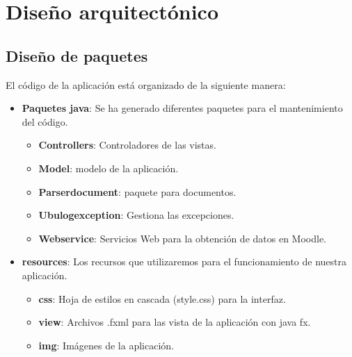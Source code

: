 \section{Diseño arquitectónico}

\subsection{Diseño de paquetes}

El código de la aplicación está organizado de la siguiente manera:

\begin{itemize}
	\tightlist
	\item
	\textbf{Paquetes java}: Se ha generado diferentes paquetes para el mantenimiento del código.
	\begin{itemize}
		\tightlist
		\item
		\textbf{Controllers}: Controladores de las vistas.
		
		
		\item
		\textbf{Model}: modelo de la aplicación.
		
		
		\item
		\textbf{Parserdocument}: paquete para documentos.
		
		\item
		\textbf{Ubulogexception}: Gestiona las excepciones.
		
		\item
		\textbf{Webservice}: Servicios Web para la obtención de datos en Moodle.
		
		
	\end{itemize}
	\item
	\textbf{resources}: Los recursos que utilizaremos para el funcionamiento de nuestra aplicación.
	\begin{itemize}
		\tightlist
		\item
		\textbf{css}: Hoja de estilos en cascada (style.css) para la interfaz.
		\item
		\textbf{view}: Archivos .fxml para las vista de la aplicación con java fx.
		
		\item
		\textbf{img}: Imágenes de la aplicación.
		
		
	\end{itemize}
	
\end{itemize}


